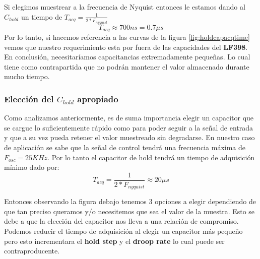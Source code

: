Si elegimos muestrear a la frecuencia de Nyquist entonces le estamos dando al $C_{hold}$ un tiempo de $T_{acq}=\frac{1}{2*F_{nyquist}}$
$$T_{acq}\approx 700ns = 0.7\mu s$$
Por lo tanto, si hacemos referencia a las curvas de la figura \ref{fig:holdcapacqtime} vemos que nuestro requerimiento esta por fuera de las capacidades del \textbf{LF398}. En conclusión, necesitaríamos capacitancias extremadamente pequeñas. Lo cual tiene como contrapartida que no podrán mantener el valor almacenado durante mucho tiempo.
\subsubsection{Elección del $C_{hold}$ apropiado}
Como analizamos anteriormente, es de suma importancia elegir un capacitor que se cargue lo suficientemente rápido como para poder seguir a la señal de entrada y que a su vez pueda retener el valor muestreado sin degradarse. 
En nuestro caso de aplicación se sabe que la señal de control tendrá una frecuencia máxima de $F_{osc}=25KHz$. Por lo tanto el capacitor de hold tendrá un tiempo de adquisición mínimo dado por:
$$T_{acq}=\frac{1}{2*F_{nyquist}}\approx20\mu s$$

Entonces observando la figura debajo tenemos 3 opciones a elegir dependiendo de que tan preciso queramos y/o necesitemos que sea el valor de la muestra. Esto se debe a que la elección del capacitor nos lleva a una relación de compromiso. Podemos reducir el tiempo de adquisición al elegir un capacitor más pequeño pero esto incrementara el \textbf{hold step} y el \textbf{droop rate} lo cual puede ser contraproducente.

